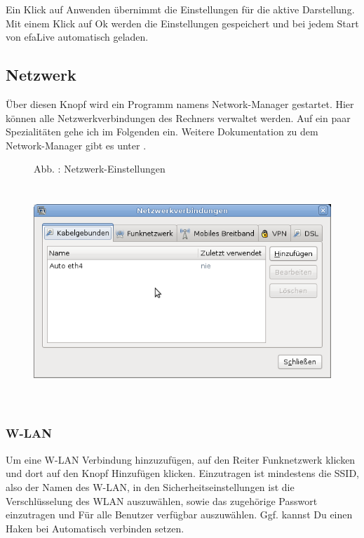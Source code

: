 \documentclass[a4paper,12pt,twoside]{article}
\newcounter{Abb}
\renewcommand\theAbb{\arabic{Abb}}
\begin{document}
Ein Klick auf {\textquotedbl}Anwenden{\textquotedbl} übernimmt die
Einstellungen für die aktive Darstellung. Mit einem Klick auf
{\textquotedbl}Ok{\textquotedbl} werden die Einstellungen gespeichert
und bei jedem Start von efaLive automatisch geladen.


\bigskip

\subsection{Netzwerk}
Über diesen Knopf wird ein Programm namens
{\textquotedbl}Network-Manager{\textquotedbl} gestartet. Hier können
alle Netzwerkverbindungen des Rechners verwaltet werden. Auf ein paar
Spezialitäten gehe ich im Folgenden ein. Weitere Dokumentation zu dem
{\textquotedbl}Network-Manager{\textquotedbl} gibt es unter
\cite{NWM1}.



\begin{figure}
\centering
\begin{minipage}{10.82cm}
Abb. \stepcounter{Abb}{\theAbb}: Netzwerk-Einstellungen
\includegraphics[width=14.87cm,height=8.678cm]{efaLivede-img/efaLivede-img23.png}\end{minipage}
\end{figure}
\subsubsection[W{}-LAN]{W-LAN}
Um eine W-LAN Verbindung hinzuzufügen, auf den Reiter
{\textquotedbl}Funknetzwerk{\textquotedbl} klicken und dort auf den
Knopf {\textquotedbl}Hinzufügen{\textquotedbl} klicken. Einzutragen ist
mindestens die SSID, also der Namen des W-LAN, in den
Sicherheitseinstellungen ist die Verschlüsselung des WLAN auszuwählen,
sowie das zugehörige Passwort einzutragen und {\textquotedbl}Für alle
Benutzer verfügbar{\textquotedbl} auszuwählen. Ggf. kannst Du einen
Haken bei {\textquotedbl}Automatisch verbinden{\textquotedbl} setzen.
\end{document}

